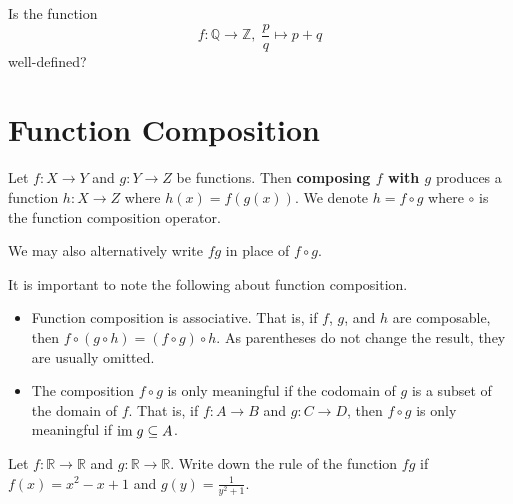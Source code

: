 \begin{exercise}
    Is the function
    \[
        f: \mathbb{Q} \to \mathbb{Z},\;\frac pq \mapsto p + q    
    \]
    well-defined?
\end{exercise}

\section{Function Composition}
\begin{definition}
    Let $f: X \to Y$ and $g: Y \to Z$ be functions. Then \textbf{composing $f$ with $g$} produces a function $h: X \to Z$ where $h(x) = f(g(x))$. We denote $h = f \circ g$ where $\circ$ is the function composition operator.
\end{definition}
\begin{remark}
    We may also alternatively write $fg$ in place of $f \circ g$.
\end{remark}

It is important to note the following about function composition.
\begin{itemize}
    \item Function composition is associative. That is, if $f$, $g$, and $h$ are composable, then $f \circ (g \circ h) = (f \circ g) \circ h$. As parentheses do not change the result, they are usually omitted.
    \item The composition $f \circ g$ is only meaningful if the codomain of $g$ is a subset of the domain of $f$. That is, if $f: A \to B$ and $g: C \to D$, then $f \circ g$ is only meaningful if $\mathrm{im}\; g \subseteq A$.
\end{itemize}

\begin{exercise}
    Let $f: \mathbb{R} \to \mathbb{R}$ and $g: \mathbb{R} \to \mathbb{R}$. Write down the rule of the function $fg$ if $f(x) = x^2 - x + 1$ and $g(y) = \frac1{y^2+1}$.
\end{exercise}

